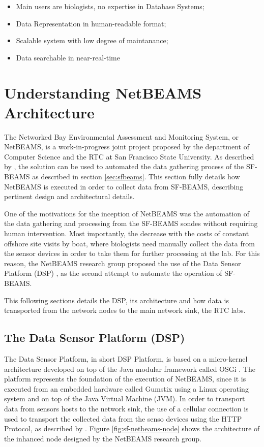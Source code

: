 \begin{itemize}
  \item Main users are biologists, no expertise in Database Systems;
  \item Data Representation in human-readable format;
  \item Scalable system with low degree of maintanance;
  \item Data searchable in near-real-time
\end{itemize}

\section{Understanding NetBEAMS Architecture}
\label{netbeams-architecture}

The Networked Bay Environmental Assessment and Monitoring System, or NetBEAMS, 
is a work-in-progress joint project proposed by the department of Computer
Science and the RTC at San Francisco State University. As described by
\cite{netbeams2009}, the solution can be used to automated the data gathering
process of the SF-BEAMS as described in section \ref{sec:sfbeams}. This
section fully details how NetBEAMS is executed in order to collect data from
SF-BEAMS, describing pertinent design and architectural details.

One of the motivations for the inception of NetBEAMS was the automation
of the data gathering and processing from the SF-BEAMS sondes without requiring
human intervention. Most importantly, the decrease with the costs of constant 
offshore site visits by boat, where biologists need manually collect the data
from the sensor devices in order to take them for further processing at the
lab. For this reason, the NetBEAMS research group proposed the use of the Data
Sensor Platform (DSP) \cite{netbeams2009}, as the second attempt to automate
the operation of SF-BEAMS.

This following sections details the DSP, its architecture and how data is
transported from the network nodes to the main network sink, the RTC labs.

\subsection{The Data Sensor Platform (DSP)}

The Data Sensor Platform, in short DSP Platform, is based on a micro-kernel
architecture developed on top of the Java modular framework called OSGi
\cite{osgi}. The platform represents the foundation of the execution of
NetBEAMS, since it is executed from an embedded hardware called Gumstix
\cite{gumstix} using a Linux operating system and on top of the Java Virtual
Machine (JVM). In order to transport data from sensors hosts to the network
sink, the use of a cellular connection is used to transport the collected data
from the senso devices using the HTTP Protocol, as described by
\citet{netbeams2009}. Figure \ref{fig:sf-netbeams-node} shows the
architecture of the inhanced node designed by the NetBEAMS research group.

